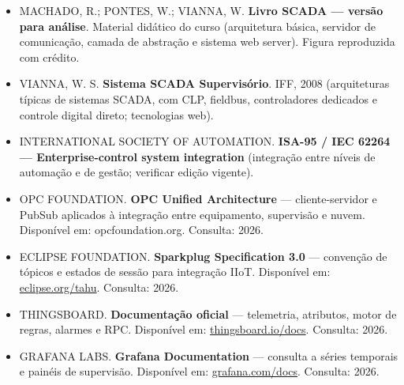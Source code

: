 \begin{itemize}
\tightlist
\item
  MACHADO, R.; PONTES, W.; VIANNA, W. \textbf{Livro SCADA --- versão para análise}. Material didático do curso (arquitetura básica, servidor de comunicação, camada de abstração e sistema web server). Figura reproduzida com crédito.
\item
  VIANNA, W. S. \textbf{Sistema SCADA Supervisório}. IFF, 2008 (arquiteturas típicas de sistemas SCADA, com CLP, fieldbus, controladores dedicados e controle digital direto; tecnologias web).
\item
  INTERNATIONAL SOCIETY OF AUTOMATION. \textbf{ISA-95 / IEC 62264 --- Enterprise-control system integration} (integração entre níveis de automação e de gestão; verificar edição vigente).
\item
  OPC FOUNDATION. \textbf{OPC Unified Architecture} --- cliente-servidor e PubSub aplicados à integração entre equipamento, supervisão e nuvem. Disponível em: opcfoundation.org. Consulta: 2026.
\item
  ECLIPSE FOUNDATION. \textbf{Sparkplug Specification 3.0} --- convenção de tópicos e estados de sessão para integração IIoT. Disponível em: \url{eclipse.org/tahu}. Consulta: 2026.
\item
  THINGSBOARD. \textbf{Documentação oficial} --- telemetria, atributos, motor de regras, alarmes e RPC. Disponível em: \url{thingsboard.io/docs}. Consulta: 2026.
\item
  GRAFANA LABS. \textbf{Grafana Documentation} --- consulta a séries temporais e painéis de supervisão. Disponível em: \url{grafana.com/docs}. Consulta: 2026.
\end{itemize}
